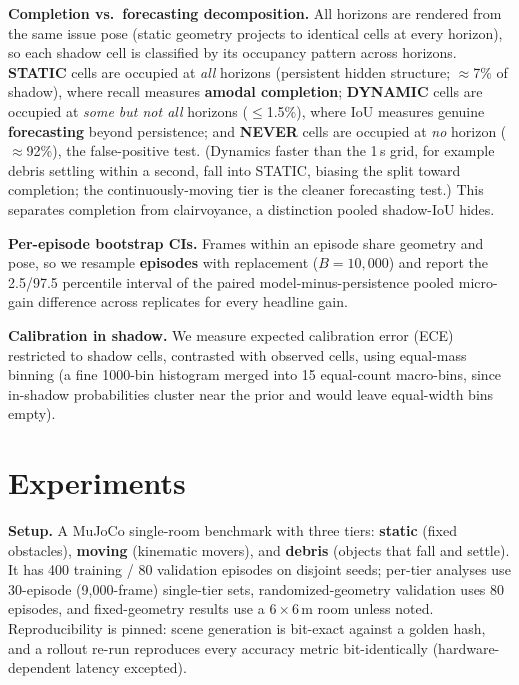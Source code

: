 \documentclass{article}
\begin{document}
\textbf{Completion vs.\ forecasting decomposition.} All horizons are rendered from the same
issue pose (static geometry projects to identical cells at every horizon), so each shadow cell
is classified by its occupancy pattern across horizons. \textbf{STATIC} cells are occupied at
\emph{all} horizons (persistent hidden structure; $\approx$7\% of shadow), where recall measures
\textbf{amodal completion}; \textbf{DYNAMIC} cells are occupied at \emph{some but not all} horizons
($\le$1.5\%), where IoU measures genuine \textbf{forecasting} beyond persistence; and \textbf{NEVER}
cells are occupied at \emph{no} horizon ($\approx$92\%), the false-positive test. (Dynamics faster
than the 1\,s grid, for example debris settling within a second, fall into STATIC, biasing the
split toward completion; the continuously-moving tier is the cleaner forecasting test.) This
separates completion from clairvoyance, a distinction pooled shadow-IoU hides.

\textbf{Per-episode bootstrap CIs.} Frames within an episode share geometry and pose, so we
resample \textbf{episodes} with replacement ($B = 10{,}000$) and report the 2.5/97.5 percentile
interval of the paired model-minus-persistence pooled micro-gain difference across replicates
for every headline gain.

\textbf{Calibration in shadow.} We measure expected calibration error (ECE) restricted to shadow
cells, contrasted with observed cells, using equal-mass binning (a fine 1000-bin histogram
merged into 15 equal-count macro-bins, since in-shadow probabilities cluster near the prior and
would leave equal-width bins empty).

\section{Experiments}
\label{sec:experiments}

\textbf{Setup.} A MuJoCo single-room benchmark with three tiers: \textbf{static} (fixed
obstacles), \textbf{moving} (kinematic movers), and \textbf{debris} (objects that fall and settle).
It has 400 training / 80 validation episodes on disjoint seeds; per-tier analyses use 30-episode
(9{,}000-frame) single-tier sets, randomized-geometry validation uses 80 episodes, and
fixed-geometry results use a $6\times6$\,m room unless noted. Reproducibility is pinned: scene
generation is bit-exact against a golden hash, and a rollout re-run reproduces every accuracy
metric bit-identically (hardware-dependent latency excepted).
\end{document}
